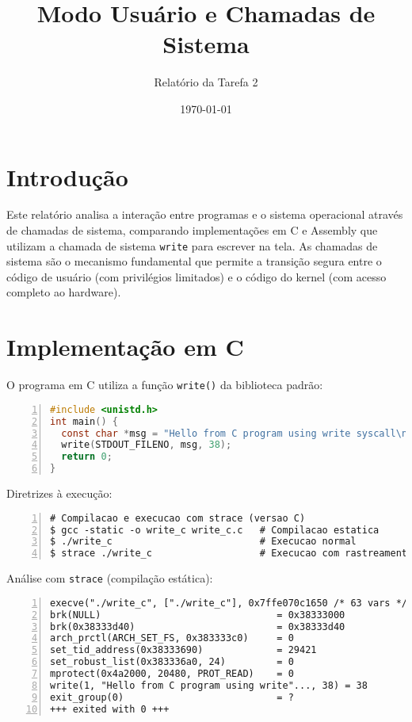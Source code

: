 \documentclass[10pt,a4paper]{article}
\title{Modo Usuário e Chamadas de Sistema}
\author{Relatório da Tarefa 2}
\date{\today}
\begin{document}
\maketitle

\section{Introdução}

Este relatório analisa a interação entre programas e o sistema operacional através de chamadas de sistema, comparando implementações em C e Assembly que utilizam a chamada de sistema \texttt{write} para escrever na tela. As chamadas de sistema são o mecanismo fundamental que permite a transição segura entre o código de usuário (com privilégios limitados) e o código do kernel (com acesso completo ao hardware).

\section{Implementação em C}

O programa em C utiliza a função \texttt{write()} da biblioteca padrão:

\begin{lstlisting}[language=C, frame=single, numbers=left]
#include <unistd.h>
int main() {
  const char *msg = "Hello from C program using write syscall\n";
  write(STDOUT_FILENO, msg, 38);
  return 0;
}
\end{lstlisting}

Diretrizes à execução:

\begin{lstlisting}[frame=single, numbers=left]
# Compilacao e execucao com strace (versao C)
$ gcc -static -o write_c write_c.c   # Compilacao estatica
$ ./write_c                          # Execucao normal
$ strace ./write_c                   # Execucao com rastreamento
\end{lstlisting}

Análise com \texttt{strace} (compilação estática):

\begin{lstlisting}[frame=single, numbers=left]
execve("./write_c", ["./write_c"], 0x7ffe070c1650 /* 63 vars */) = 0
brk(NULL)                               = 0x38333000
brk(0x38333d40)                         = 0x38333d40
arch_prctl(ARCH_SET_FS, 0x383333c0)     = 0
set_tid_address(0x38333690)             = 29421
set_robust_list(0x383336a0, 24)         = 0
mprotect(0x4a2000, 20480, PROT_READ)    = 0
write(1, "Hello from C program using write"..., 38) = 38
exit_group(0)                           = ?
+++ exited with 0 +++
\end{lstlisting}
\end{document}
